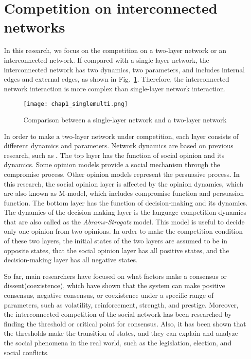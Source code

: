 \section{Competition on interconnected networks}
In this research, we focus on the competition on a two-layer network or an interconnected network. If compared with a single-layer network, the interconnected network has two dynamics, two parameters, and includes internal edges and external edges, as shown in Fig.~\ref{chap1_singlemulti}. Therefore, the interconnected network interaction is more complex than single-layer network interaction.

\begin{figure}[!htb]
	\centering
	\texttt{[image: chap1\_singlemulti.png]}
	\caption{Comparison between a single-layer network and a two-layer network}
	\label{chap1_singlemulti}
\end{figure}

In order to make a two-layer network under competition, each layer consists of different dynamics and parameters. Network dynamics are based on previous research, such as \parencite{alvarez2016}. The top layer has the function of social opinion and its dynamics. Some opinion models provide a social mechanism through the compromise process\parencite{naim2003}. Other opinion models represent the persuasive process\parencite{chau2014}. In this research, the social opinion layer is affected by the opinion dynamics, which are also known as M-model\parencite{rocca2014}, which includes compromise function and persuasion function. The bottom layer has the function of decision-making and its dynamics. The dynamics of the decision-making layer is the language competition dynamics that are also called as the \textit{Abrams-Strogatz} model\parencite{abrams2003, vazquez2010, patriarca2012}. This model is useful to decide only one opinion from two opinions. In order to make the competition condition of these two layers, the initial states of the two layers are assumed to be in opposite states, that the social opinion layer has all positive states, and the decision-making layer has all negative states\parencite{alvarez2016}.

So far, main researchers have focused on what factors make a consensus or dissent(coexistence), which have shown that the system can make positive consensus, negative consensus, or coexistence under a specific range of parameters, such as volatility, reinforcement, strength, and prestige\parencite{alvarez2016}. Moreover, the interconnected competition of the social network has been researched by finding the threshold or critical point for consensus\parencite{alvarez2016, gomez2015, diep2017}. Also, it has been shown that the thresholds make the transition of states, and they can explain and analyze the social phenomena in the real world, such as the legislation, election, and social conflicts\parencite{alvarez2016, gomez2015, amato2017, diep2017}.

